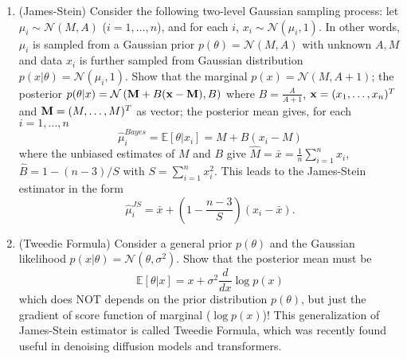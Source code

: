 \documentclass[11pt]{article}
\def\E{{\mathbb E}}
\begin{document}
\begin{enumerate}
\begin{enumerate}
\item (James-Stein) Consider the following two-level Gaussian sampling process: let $\mu_i \sim \mathcal{N}(M,A)$ ($i=1,\ldots, n$), and for each $i$, $x_i\sim \mathcal{N}(\mu_i,1)$. In other words, $\mu_i$ is sampled from a Gaussian prior $ p(\theta) = \mathcal{N}(M,A)$ with unknown $A,M$ and data $x_i$ is further sampled from Gaussian distribution $p(x|\theta)=\mathcal{N}(\mu_i,1)$. Show that 
\subitem[i.] the marginal $p(x) = \mathcal{N}(M, A+1)$; 
\subitem[ii.] the posterior $p(\theta | x) = \mathcal{N}\left( {\bf M}+B({\bf x}-{\bf M}), B\right)$ where $B=\frac{A}{A+1}$, ${\bf x}=(x_1,\ldots,x_n)^T$ and ${\bf M}=(M,\ldots, M)^T$ as vector;
\subitem[iii.] the posterior mean gives, for each $i=1,\ldots,n$
\[ \widehat{\mu}_i^{Bayes} = \E[\theta | x_i] = M + B(x_i-M) 
\] 
where the unbiased estimates of $M$ and $B$ give $\widehat{M}=\bar{x}=\frac{1}{n}\sum_{i=1}^n x_i$, $\widehat{B}=1-(n-3)/S$ with $S = \sum_{i=1}^n x_i^2$. This leads to the James-Stein estimator in the form 
\[  \widehat{\mu}^{JS}_i =  \bar{x} + \left(1- \frac{n-3 }{S} \right) (x_i - \bar{x}) .
\] 
\item (Tweedie Formula) Consider a general prior $p(\theta)$ and the Gaussian likelihood $p(x|\theta) = \mathcal{N}(\theta,\sigma^2)$. Show that the posterior mean must be
\begin{equation} 
\E[\theta | x] = x + \sigma^2 \frac{d}{dx} \log p(x) 
\end{equation} 
which does NOT depends on the prior distribution $p(\theta)$, but just the gradient of score function of marginal ($\log p(x)$)!  This generalization of James-Stein estimator is called Tweedie Formula, which was recently found useful in denoising diffusion models and transformers.
\end{enumerate}


\end{enumerate}
\end{document}
